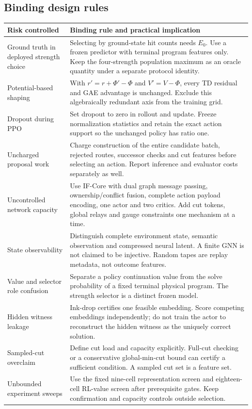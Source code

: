 \subsection*{Binding design rules}
{\small
\begin{longtable}{@{}P{.22\textwidth}P{.71\textwidth}@{}}
\toprule
Risk controlled & Binding rule and practical implication\\\midrule\endhead
Ground truth in deployed strength choice & Selecting by ground-state hit counts needs $E_0$. Use a frozen predictor with terminal program features only. Keep the four-strength population maximum as an oracle quantity under a separate protocol identity.\\
Potential-based shaping & With $r'=r+\Phi'-\Phi$ and $V'=V-\Phi$, every TD residual and GAE advantage is unchanged. Exclude this algebraically redundant axis from the training grid.\\
Dropout during PPO & Set dropout to zero in rollout and update. Freeze normalization statistics and retain the exact action support so the unchanged policy has ratio one.\\
Uncharged proposal work & Charge construction of the entire candidate batch, rejected routes, successor checks and cut features before selecting an action. Report inference and evaluator costs separately as well.\\
Uncontrolled network capacity & Use IF-Core with dual graph message passing, ownership/conflict fusion, complete action payload encoding, one actor and two critics. Add cut tokens, global relays and gauge constraints one mechanism at a time.\\
State observability & Distinguish complete environment state, semantic observation and compressed neural latent. A finite GNN is not claimed to be injective. Random tapes are replay metadata, not outcome features.\\
Value and selector role confusion & Separate a policy continuation value from the solve probability of a fixed terminal physical program. The strength selector is a distinct frozen model.\\
Hidden witness leakage & Ink-drop certifies one feasible embedding. Score competing embeddings independently; do not train the actor to reconstruct the hidden witness as the uniquely correct solution.\\
Sampled-cut overclaim & Define cut load and capacity explicitly. Full-cut checking or a conservative global-min-cut bound can certify a sufficient condition. A sampled cut set is a feature set.\\
Unbounded experiment sweeps & Use the fixed nine-cell representation screen and eighteen-cell RL-value screen after prerequisite gates. Keep confirmation and capacity controls outside selection.\\
\bottomrule
\end{longtable}}

